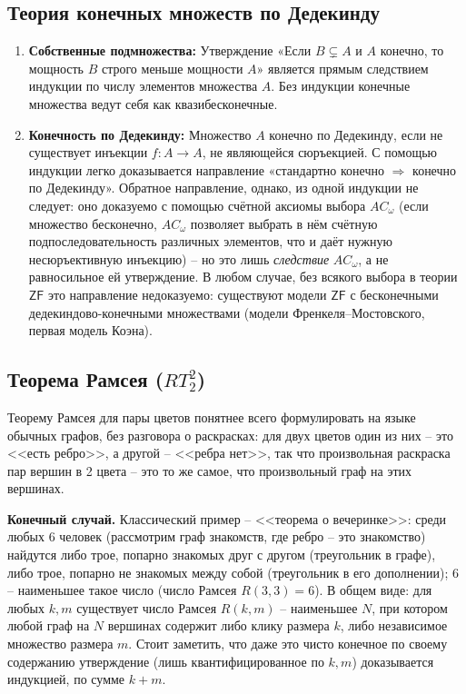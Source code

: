 \documentclass[12pt,a4paper]{article}
\theoremstyle{plain}
\theoremstyle{definition}
\newcommand{\toinf}{\rightarrow}
\begin{document}
\subsection{Теория конечных множеств по Дедекинду}
\begin{enumerate}[label=\arabic*.]
    \item \textbf{Собственные подмножества:} Утверждение «Если $B \subsetneq A$ и $A$ конечно, то мощность $B$ строго меньше мощности $A$» является прямым следствием индукции по числу элементов множества $A$. Без индукции конечные множества ведут себя как квазибесконечные.
    \item \textbf{Конечность по Дедекинду:} Множество $A$ конечно по Дедекинду, если не существует инъекции $f: A \toinf A$, не являющейся сюръекцией. С помощью индукции легко доказывается направление «стандартно конечно $\Rightarrow$ конечно по Дедекинду». Обратное направление, однако, из одной индукции не следует: оно доказуемо с помощью счётной аксиомы выбора $AC_\omega$ (если множество бесконечно, $AC_\omega$ позволяет выбрать в нём счётную подпоследовательность различных элементов, что и даёт нужную несюръективную инъекцию) -- но это лишь \emph{следствие} $AC_\omega$, а не равносильное ей утверждение. В любом случае, без всякого выбора в теории $\textsf{ZF}$ это направление недоказуемо: существуют модели $\textsf{ZF}$ с бесконечными дедекиндово-конечными множествами (модели Френкеля--Мостовского, первая модель Коэна).
\end{enumerate}

\subsection{Теорема Рамсея ($RT^2_2$)}
Теорему Рамсея для пары цветов понятнее всего формулировать на языке обычных графов, без разговора о раскрасках: для двух цветов один из них -- это <<есть ребро>>, а другой -- <<ребра нет>>, так что произвольная раскраска пар вершин в 2 цвета -- это то же самое, что произвольный граф на этих вершинах.

\textbf{Конечный случай.} Классический пример -- <<теорема о вечеринке>>: среди любых 6 человек (рассмотрим граф знакомств, где ребро -- это знакомство) найдутся либо трое, попарно знакомых друг с другом (треугольник в графе), либо трое, попарно не знакомых между собой (треугольник в его дополнении); 6 -- наименьшее такое число (число Рамсея $R(3,3)=6$). В общем виде: для любых $k,m$ существует число Рамсея $R(k,m)$ -- наименьшее $N$, при котором любой граф на $N$ вершинах содержит либо клику размера $k$, либо независимое множество размера $m$. Стоит заметить, что даже это чисто конечное по своему содержанию утверждение (лишь квантифицированное по $k,m$) доказывается индукцией, по сумме $k+m$.
\end{document}
